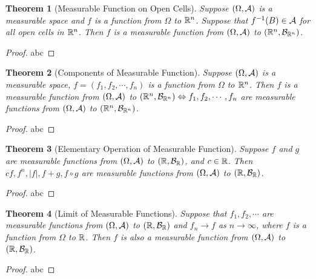 \documentclass[openany,12pt]{book}
\newtheorem{theorem}{Theorem}[chapter]
\begin{document}
\begin{theorem}[Measurable Function on Open Cells]
  Suppose $(\Omega,\mathcal{A})$ is a measurable space and $f$ is a function from $\Omega$ to $\mathbb{R}^n$. Suppose that $f^{-1}(B)\in\mathcal{A}$ for all open cells in $\mathbb{R}^n$. Then $f$ is a measurable function from $(\Omega,\mathcal{A})$ to $(\mathbb{R}^n,\mathcal{B}_{\mathbb{R}^n})$.
\end{theorem}

\begin{proof}
  abc
\end{proof}

\begin{theorem}[Components of Measurable Function]
  Suppose $(\Omega,\mathcal{A})$ is a measurable space,  $f=(f_1,f_2, \cdots,f_n)$  is a function from $\Omega$ to $\mathbb{R}^n$. Then $f$ is a measurable function from  $(\Omega,\mathcal{A})$ to $(\mathbb{R}^n,\mathcal{B}_{\mathbb{R}^n})\Leftrightarrow f_1,f_2, \cdots,f_n$ are measurable functions from $(\Omega,\mathcal{A})$ to $(\mathbb{R}^n,\mathcal{B}_{\mathbb{R}^n})$.
\end{theorem}

\begin{proof}
  abc
\end{proof}

\begin{theorem}[Elementary Operation of Measurable Function]
  Suppose $f$ and $g$ are measurable functions from $(\Omega,\mathcal{A})$ to $(\mathbb{R},\mathcal{B}_{\mathbb{R}})$, and $c\in\mathbb{R}$. Then $cf, f^n, |f|, f+g, f\circ g$ are measurable functions from $(\Omega,\mathcal{A})$ to $(\mathbb{R},\mathcal{B}_{\mathbb{R}})$.
\end{theorem}

\begin{proof}
  abc
\end{proof}

\begin{theorem}[Limit of Measurable Functions]
  Suppose that $f_1,f_2,\cdots$ are measurable functions from $(\Omega,\mathcal{A})$ to $(\mathbb{R},\mathcal{B}_{\mathbb{R}})$ and $f_n\to f$ as $n\to\infty$, where $f$ is a function from $\Omega$ to $\mathbb{R}$. Then $f$ is also a measurable function from $(\Omega,\mathcal{A})$ to $(\mathbb{R},\mathcal{B}_{\mathbb{R}})$.
\end{theorem}

\begin{proof}
  abc
\end{proof}
\end{document}

